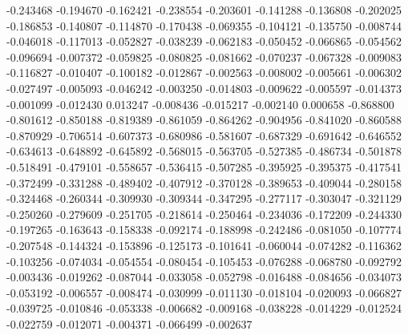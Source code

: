 -0.243468
-0.194670
-0.162421
-0.238554
-0.203601
-0.141288
-0.136808
-0.202025
-0.186853
-0.140807
-0.114870
-0.170438
-0.069355
-0.104121
-0.135750
-0.008744
-0.046018
-0.117013
-0.052827
-0.038239
-0.062183
-0.050452
-0.066865
-0.054562
-0.096694
-0.007372
-0.059825
-0.080825
-0.081662
-0.070237
-0.067328
-0.009083
-0.116827
-0.010407
-0.100182
-0.012867
-0.002563
-0.008002
-0.005661
-0.006302
-0.027497
-0.005093
-0.046242
-0.003250
-0.014803
-0.009622
-0.005597
-0.014373
-0.001099
-0.012430
0.013247
-0.008436
-0.015217
-0.002140
0.000658
-0.868800
-0.801612
-0.850188
-0.819389
-0.861059
-0.864262
-0.904956
-0.841020
-0.860588
-0.870929
-0.706514
-0.607373
-0.680986
-0.581607
-0.687329
-0.691642
-0.646552
-0.634613
-0.648892
-0.645892
-0.568015
-0.563705
-0.527385
-0.486734
-0.501878
-0.518491
-0.479101
-0.558657
-0.536415
-0.507285
-0.395925
-0.395375
-0.417541
-0.372499
-0.331288
-0.489402
-0.407912
-0.370128
-0.389653
-0.409044
-0.280158
-0.324468
-0.260344
-0.309930
-0.309344
-0.347295
-0.277117
-0.303047
-0.321129
-0.250260
-0.279609
-0.251705
-0.218614
-0.250464
-0.234036
-0.172209
-0.244330
-0.197265
-0.163643
-0.158338
-0.092174
-0.188998
-0.242486
-0.081050
-0.107774
-0.207548
-0.144324
-0.153896
-0.125173
-0.101641
-0.060044
-0.074282
-0.116362
-0.103256
-0.074034
-0.054554
-0.080454
-0.105453
-0.076288
-0.068780
-0.092792
-0.003436
-0.019262
-0.087044
-0.033058
-0.052798
-0.016488
-0.084656
-0.034073
-0.053192
-0.006557
-0.008474
-0.030999
-0.011130
-0.018104
-0.020093
-0.066827
-0.039725
-0.010846
-0.053338
-0.006682
-0.009168
-0.038228
-0.014229
-0.012524
-0.022759
-0.012071
-0.004371
-0.066499
-0.002637
